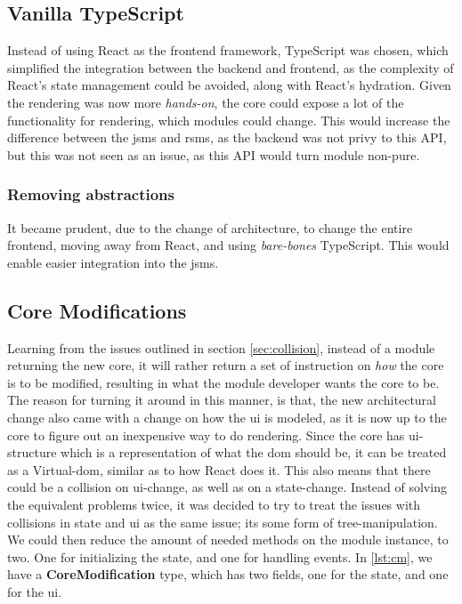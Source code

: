 \subsection{Vanilla TypeScript}

Instead of using React as the frontend framework, TypeScript was chosen, which
simplified the integration between the backend and frontend, as the complexity
of React's state management could be avoided, along with React's hydration.
Given the rendering was now more \textit{hands-on}, the core could expose a lot
of the functionality for rendering, which modules could change. This would
increase the difference between the \gls{jsms} and \gls{rsms}, as the backend
was not privy to this API, but this was not seen as an issue, as this API would
turn module non-pure.

\subsubsection{Removing abstractions}

It became prudent, due to the change of architecture, to change the entire
frontend, moving away from React, and using \textit{bare-bones} TypeScript. This
would enable easier integration into the \gls{jsms}.

\subsection{Core Modifications}

Learning from the issues outlined in section \ref{sec:collision}, instead of a
module returning the new core, it will rather return a set of instruction on
\textit{how} the core is to be modified, resulting in what the module developer
wants the core to be. The reason for turning it around in this manner, is that,
the new architectural change also came with a change on how the \gls{ui} is
modeled, as it is now up to the core to figure out an inexpensive way to do
rendering. Since the core has \gls{ui}-structure which is a representation of
what the \gls{dom} should be, it can be treated as a Virtual-\gls{dom}, similar
as to how React does it. This also means that there could be a collision on
\gls{ui}-change, as well as on a state-change. Instead of solving the equivalent
problems twice, it was decided to try to treat the issues with collisions in
state and \gls{ui} as the same issue; its some form of tree-manipulation. We
could then reduce the amount of needed methods on the module instance, to two.
One for initializing the state, and one for handling events. In \ref{lst:cm},
we have a \textbf{CoreModification} type, which has two fields, one for the
state, and one for the \gls{ui}.

